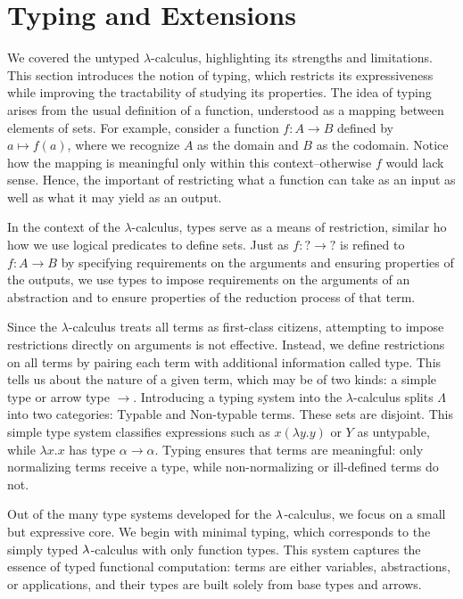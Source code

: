 
\chapter{Typing and Extensions}

We covered the untyped \(\lambda\)-calculus, highlighting its strengths and limitations.
This section introduces the notion of typing, which restricts its expressiveness while improving the tractability of studying its properties.
The idea of typing arises from the usual definition of a function, understood as a mapping between elements of sets.
For example, consider a function  
\( f : A \to B \) defined by \( a \mapsto f(a) \), where we recognize \(A\) as the domain and \(B\) as the codomain.
Notice how the mapping is meaningful only within this context--otherwise \( f \) would lack sense.
Hence, the important of restricting what a function can take as an input as well as what it may yield as an output.

In the context of the \(\lambda\)-calculus, types serve as a means of restriction, similar ho how we use logical predicates to define sets.
Just as \( f : \mathbf{?} \to \mathbf{?} \) is refined to \( f : A \to B \) by specifying requirements on the arguments and ensuring properties of the outputs, we use types to impose requirements on the arguments of an abstraction and to ensure properties of the reduction process of that term.

Since the \(\lambda\)-calculus treats all terms as first-class citizens, attempting to impose  
restrictions directly on arguments is not effective. Instead, we define restrictions  
on all terms by pairing each term with additional information called type.  
This tells us about the nature of a given term, which may be of two kinds: a simple  
type or arrow type \(\to\). Introducing a typing system into the \(\lambda\)-calculus splits \(\Lambda\) into two categories:
Typable and Non-typable terms. These sets are disjoint. This simple type system classifies expressions such as  
\( x (\lambda y.y) \) or \( Y \) as untypable, while \( \lambda x.x \) has type  
\(\alpha \to \alpha\). Typing ensures that terms are meaningful: only normalizing terms receive a type, while non-normalizing or ill-defined terms do not.

Out of the many type systems developed for the $\lambda$-calculus, we focus on a small but expressive core. We begin with minimal typing, which corresponds to the simply typed $\lambda$-calculus with only function types. This system captures the essence of typed functional computation: terms are either variables, abstractions, or applications, and their types are built solely from base types and arrows.

